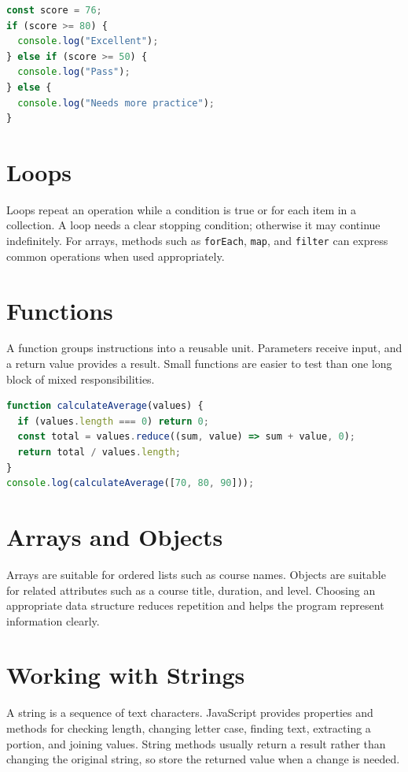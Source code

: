 \documentclass[11pt,openany,oneside]{book}
\begin{document}
\begin{lstlisting}[style=webcode,language=JavaScript]
const score = 76;
if (score >= 80) {
  console.log("Excellent");
} else if (score >= 50) {
  console.log("Pass");
} else {
  console.log("Needs more practice");
}
\end{lstlisting}

\section{Loops}
Loops repeat an operation while a condition is true or for each item in a collection. A loop needs a clear stopping condition; otherwise it may continue indefinitely. For arrays, methods such as \texttt{forEach}, \texttt{map}, and \texttt{filter} can express common operations when used appropriately.

\section{Functions}
A function groups instructions into a reusable unit. Parameters receive input, and a return value provides a result. Small functions are easier to test than one long block of mixed responsibilities.

\begin{lstlisting}[style=webcode,language=JavaScript]
function calculateAverage(values) {
  if (values.length === 0) return 0;
  const total = values.reduce((sum, value) => sum + value, 0);
  return total / values.length;
}
console.log(calculateAverage([70, 80, 90]));
\end{lstlisting}

\section{Arrays and Objects}
Arrays are suitable for ordered lists such as course names. Objects are suitable for related attributes such as a course title, duration, and level. Choosing an appropriate data structure reduces repetition and helps the program represent information clearly.


\section{Working with Strings}
A string is a sequence of text characters. JavaScript provides properties and methods for checking length, changing letter case, finding text, extracting a portion, and joining values. String methods usually return a result rather than changing the original string, so store the returned value when a change is needed.
\end{document}

